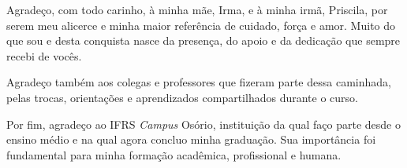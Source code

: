 \begin{agradecimentos}
Agradeço, com todo carinho, à minha mãe, Irma, e à minha irmã, Priscila,
por serem meu alicerce e minha maior referência de cuidado, força e amor. Muito
do que sou e desta conquista nasce da presença, do apoio e da dedicação que
sempre recebi de vocês.

Agradeço também aos colegas e professores que fizeram parte dessa caminhada,
pelas trocas, orientações e aprendizados compartilhados durante o curso.

Por fim, agradeço ao IFRS \textit{Campus} Osório, instituição da qual faço parte
desde o ensino médio e na qual agora concluo minha graduação. Sua importância
foi fundamental para minha formação acadêmica, profissional e humana.

\end{agradecimentos}
